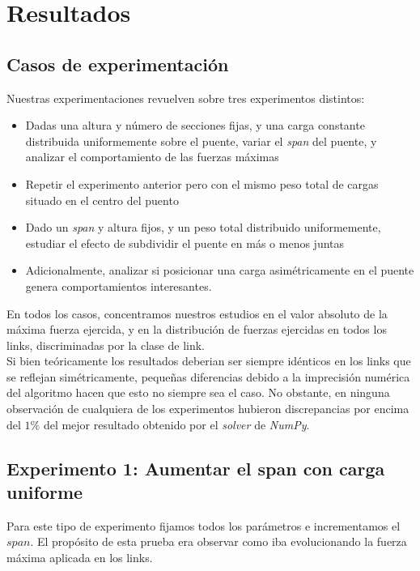 \section{Resultados}

\subsection{Casos de experimentación}

Nuestras experimentaciones revuelven sobre tres experimentos distintos:
\begin{itemize}
	\item Dadas una altura y número de secciones fijas, y una carga constante distribuida uniformemente sobre el puente, variar el \textit{span} del puente, y analizar el comportamiento de las fuerzas máximas
	\item Repetir el experimento anterior pero con el mismo peso total de cargas situado en el centro del puento
	\item Dado un \textit{span} y altura fijos, y un peso total distribuido uniformemente, estudiar el efecto de subdividir el puente en más o menos juntas
	\item Adicionalmente, analizar si posicionar una carga asimétricamente en el puente genera comportamientos interesantes.
\end {itemize}

En todos los casos, concentramos nuestros estudios en el valor absoluto de la máxima fuerza ejercida, y en la distribución de fuerzas ejercidas en todos los links, discriminadas por la clase de link.\\

Si bien teóricamente los resultados deberian ser siempre idénticos en los links
que se reflejan simétricamente, pequeñas diferencias debido a la imprecisión 
numérica del algoritmo hacen que esto no siempre sea el caso. No obstante,
en ninguna observación de cualquiera de los experimentos hubieron discrepancias
por encima del $1\%$ del mejor resultado obtenido por el \textit{solver} de \textit{NumPy}.\\

\subsection{Experimento 1: Aumentar el span con carga uniforme}

Para este tipo de experimento fijamos todos los parámetros e incrementamos el $span$. El propósito de esta prueba era observar como iba evolucionando la fuerza máxima aplicada en los links.\\

